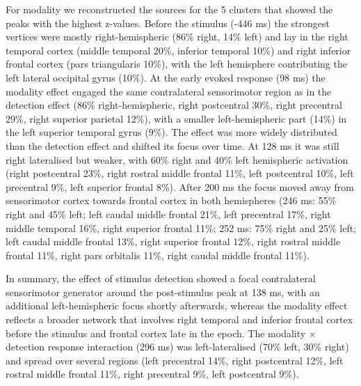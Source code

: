 \documentclass[11pt,a4paper,onecolumn]{article}
\begin{document}
For modality we reconstructed the sources for the 5 clusters that showed the peaks with the highest z-values. Before the stimulus (-446 ms) the strongest vertices were mostly right-hemispheric (86\% right, 14\% left) and lay in the right temporal cortex (middle temporal 20\%, inferior temporal 10\%) and right inferior frontal cortex (pars triangularis 10\%), with the left hemisphere contributing the left lateral occipital gyrus (10\%). At the early evoked response (98 ms) the modality effect engaged the same contralateral sensorimotor region as in the detection effect (86\% right-hemispheric, right postcentral 30\%, right precentral 29\%, right superior parietal 12\%), with a smaller left-hemispheric part (14\%) in the left superior temporal gyrus (9\%). The effect was more widely distributed than the detection effect and shifted its focus over time. At 128 ms it was still right lateralised but weaker, with 60\% right and 40\% left hemispheric activation (right postcentral 23\%, right rostral middle frontal 11\%, left postcentral 10\%, left precentral 9\%, left superior frontal 8\%). After 200 ms the focus moved away from sensorimotor cortex towards frontal cortex in both hemispheres (246 ms: 55\% right and 45\% left; left caudal middle frontal 21\%, left precentral 17\%, right middle temporal 16\%, right superior frontal 11\%; 252 ms: 75\% right and 25\% left; left caudal middle frontal 13\%, right superior frontal 12\%, right rostral middle frontal 11\%, right pars orbitalis 11\%, right caudal middle frontal 11\%). 

In summary, the effect of stimulus detection showed a focal contralateral sensorimotor generator around the post-stimulus peak at 138 ms, with an additional left-hemispheric focus shortly afterwards, whereas the modality effect reflects a broader network that involves right temporal and inferior frontal cortex before the stimulus and frontal cortex late in the epoch. The modality $\times$ detection response interaction (296 ms) was left-lateralised (70\% left, 30\% right) and spread over several regions (left precentral 14\%, right postcentral 12\%, left rostral middle frontal 11\%, right precentral 9\%, left postcentral 9\%).

\vspace{-7pt}
\end{document}
